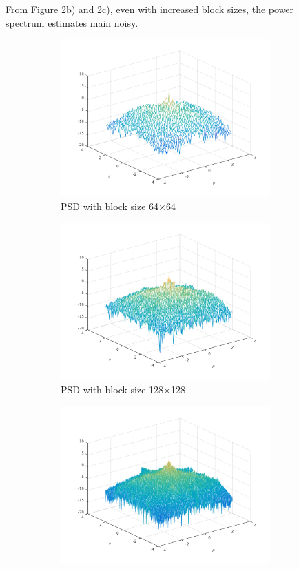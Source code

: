 \documentclass{article}
\begin{document}
	\begin{description}
	\item[]
	From Figure 2b) and 2c), even with increased block sizes, the power spectrum estimates
	main noisy.
		\begin{figure}[h]
			\begin{subfigure}{0.55\textwidth}
				\includegraphics[width=0.9\linewidth, left]{psd_64x64.png} 
				\caption{PSD with block size 64$\times$64}
			\end{subfigure}
			\begin{subfigure}{0.55\textwidth}
				\includegraphics[width=0.9\linewidth, right]{psd_128x128.png}
				\caption{PSD with block size 128$\times$128}
			\end{subfigure}
			\begin{subfigure}{1.0\textwidth}
				\includegraphics[width=0.6\linewidth, center]{psd_256x256.png}

\end{subfigure}
\end{figure}
\end{description}
\end{document}

